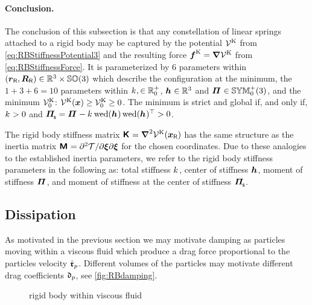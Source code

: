 \paragraph{Conclusion.}
The conclusion of this subsection is that any constellation of linear springs attached to a rigid body may be captured by the potential $\mathcal{V}^{\mathrm{K}}$ from \eqref{eq:RBStiffnessPotential3} and the resulting force $\boldsymbol{f}^{\mathrm{K}} = \boldsymbol{\nabla}\mathcal{V}^{\mathrm{K}}$ from \eqref{eq:RBStiffnessForce}.
It is parameterized by 6 parameters within $(\boldsymbol{r}_{\mathsf{R}},\boldsymbol{R}_{\mathsf{R}}) \in \mathbb{R}^3 \times \mathbb{SO}(3)$ which describe the configuration at the minimum, the $1+3+6=10$ parameters within $\bodyStiffness{}{}, \in\RealNum^+_0$, $\bodyCOS{}{} \in \RealNum^3$ and $\bodyMOS{}{} \in \SymMatSP(3)$, and the minimum $\mathcal{V}^{\mathrm{K}}_0$: $\mathcal{V}^{\mathrm{K}}(\boldsymbol{x}) \geq \mathcal{V}^{\mathrm{K}}_0 \geq 0$.
The minimum is strict and global if, and only if, $\bodyStiffness{}{} > 0$ and $\bodyMOSs{}{} = \bodyMOS{}{} - \bodyStiffness{}{} \wedOp(\bodyCOS{}{}) \wedOp(\bodyCOS{}{})^\top > 0$.

The rigid body stiffness matrix $\bodyStiffMat{}{} = \differential^2\potentialStiff(\sysCoordR)$ has the same structure as the inertia matrix $\bodyInertiaMat{}{} = \sfrac{\partial^2 \kineticEnergy}{\partial \sysVel \partial \sysVel}$ for the chosen coordinates.
Due to these analogies to the established inertia parameters, we refer to the rigid body stiffness parameters in the following as: total stiffness $\bodyStiffness{}{}$, center of stiffness $\bodyCOS{}{}$, moment of stiffness $\bodyMOS{}{}$, and moment of stiffness at the center of stiffness $\bodyMOSs{}{}$.

\subsection{Dissipation}\label{sec:DampingSE3}
As motivated in the previous section we may motivate damping as particles moving within a viscous fluid which produce a drag force proportional to the particles velocity $\dot{\boldsymbol{\mathfrak{r}}}_{p}$.
Different volumes of the particles may motivate different drag coefficients $\mathfrak{d}_{p}$, see \autoref{fig:RBdamping}.
\begin{figure}[ht]
 \centering
 
 \caption{rigid body within viscous fluid}
 \label{fig:RBdamping}
\end{figure}

